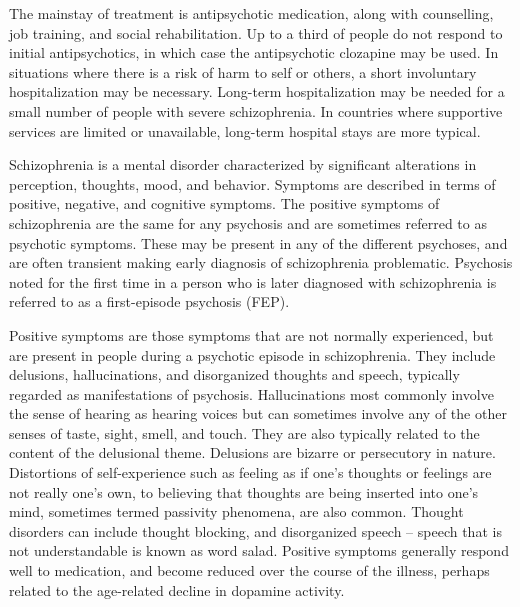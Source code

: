 The mainstay of treatment is antipsychotic medication, along with
counselling, job training, and social rehabilitation. Up to a third of
people do not respond to initial antipsychotics, in which case the
antipsychotic clozapine may be used. In situations where there is a risk
of harm to self or others, a short involuntary hospitalization may be
necessary. Long-term hospitalization may be needed for a small number of
people with severe schizophrenia. In countries where supportive services
are limited or unavailable, long-term hospital stays are more typical.

Schizophrenia is a mental disorder characterized by significant
alterations in perception, thoughts, mood, and behavior. Symptoms are
described in terms of positive, negative, and cognitive symptoms. The
positive symptoms of schizophrenia are the same for any psychosis and
are sometimes referred to as psychotic symptoms. These may be present in
any of the different psychoses, and are often transient making early
diagnosis of schizophrenia problematic. Psychosis noted for the first
time in a person who is later diagnosed with schizophrenia is referred
to as a first-episode psychosis (FEP).

Positive symptoms are those symptoms that are not normally experienced,
but are present in people during a psychotic episode in schizophrenia.
They include delusions, hallucinations, and disorganized thoughts and
speech, typically regarded as manifestations of psychosis.
Hallucinations most commonly involve the sense of hearing as hearing
voices but can sometimes involve any of the other senses of taste,
sight, smell, and touch. They are also typically related to the content
of the delusional theme. Delusions are bizarre or persecutory in nature.
Distortions of self-experience such as feeling as if one's thoughts or
feelings are not really one's own, to believing that thoughts are being
inserted into one's mind, sometimes termed passivity phenomena, are also
common. Thought disorders can include thought blocking, and disorganized
speech -- speech that is not understandable is known as word salad.
Positive symptoms generally respond well to medication, and become
reduced over the course of the illness, perhaps related to the
age-related decline in dopamine activity.


